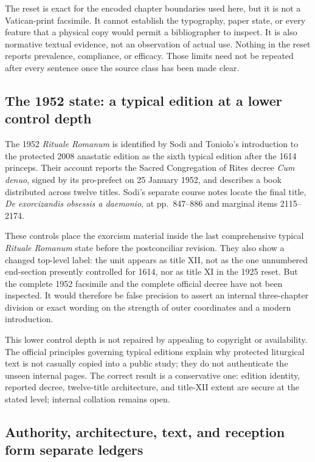 The reset is exact for the encoded chapter boundaries used here, but it is not
a Vatican-print facsimile. It cannot establish the typography, paper state,
or every feature that a physical copy would permit a bibliographer to inspect.
It is also normative textual evidence, not an observation of actual use.
Nothing in the reset reports prevalence, compliance, or efficacy. Those
limits need not be repeated after every sentence once the source class has
been made clear.

\subsection{The 1952 state: a typical edition at a lower control depth}

The 1952 \emph{Rituale Romanum} is identified by Sodi and Toniolo's
introduction to the protected 2008 anastatic edition as the sixth typical
edition after the 1614 princeps. Their account reports the Sacred Congregation
of Rites decree \emph{Cum denuo}, signed by its pro-prefect on 25 January
1952, and describes a book distributed across twelve titles. Sodi's separate
course notes locate the final title, \emph{De exorcizandis obsessis a
daemonio}, at pp.~847--886 and marginal items 2115--2174.

These controls place the exorcism material inside the last comprehensive
typical \emph{Rituale Romanum} state before the postconciliar revision. They
also show a changed top-level label: the unit appears as title XII, not as the
one unnumbered end-section presently controlled for 1614, nor as title XI in
the 1925 reset. But the complete 1952 facsimile and the complete official
decree have not been inspected. It would therefore be false precision to
assert an internal three-chapter division or exact wording on the strength of
outer coordinates and a modern introduction.

This lower control depth is not repaired by appealing to copyright or
availability. The official principles governing typical editions explain why
protected liturgical text is not casually copied into a public study; they do
not authenticate the unseen internal pages. The correct result is a
conservative one: edition identity, reported decree, twelve-title
architecture, and title-XII extent are secure at the stated level; internal
collation remains open.

\subsection{Authority, architecture, text, and reception form separate ledgers}

